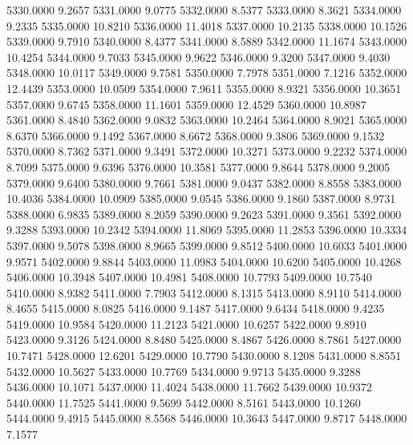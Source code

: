 5330.0000      9.2657
5331.0000      9.0775
5332.0000      8.5377
5333.0000      8.3621
5334.0000      9.2335
5335.0000     10.8210
5336.0000     11.4018
5337.0000     10.2135
5338.0000     10.1526
5339.0000      9.7910
5340.0000      8.4377
5341.0000      8.5889
5342.0000     11.1674
5343.0000     10.4254
5344.0000      9.7033
5345.0000      9.9622
5346.0000      9.3200
5347.0000      9.4030
5348.0000     10.0117
5349.0000      9.7581
5350.0000      7.7978
5351.0000      7.1216
5352.0000     12.4439
5353.0000     10.0509
5354.0000      7.9611
5355.0000      8.9321
5356.0000     10.3651
5357.0000      9.6745
5358.0000     11.1601
5359.0000     12.4529
5360.0000     10.8987
5361.0000      8.4840
5362.0000      9.0832
5363.0000     10.2464
5364.0000      8.9021
5365.0000      8.6370
5366.0000      9.1492
5367.0000      8.6672
5368.0000      9.3806
5369.0000      9.1532
5370.0000      8.7362
5371.0000      9.3491
5372.0000     10.3271
5373.0000      9.2232
5374.0000      8.7099
5375.0000      9.6396
5376.0000     10.3581
5377.0000      9.8644
5378.0000      9.2005
5379.0000      9.6400
5380.0000      9.7661
5381.0000      9.0437
5382.0000      8.8558
5383.0000     10.4036
5384.0000     10.0909
5385.0000      9.0545
5386.0000      9.1860
5387.0000      8.9731
5388.0000      6.9835
5389.0000      8.2059
5390.0000      9.2623
5391.0000      9.3561
5392.0000      9.3288
5393.0000     10.2342
5394.0000     11.8069
5395.0000     11.2853
5396.0000     10.3334
5397.0000      9.5078
5398.0000      8.9665
5399.0000      9.8512
5400.0000     10.6033
5401.0000      9.9571
5402.0000      9.8844
5403.0000     11.0983
5404.0000     10.6200
5405.0000     10.4268
5406.0000     10.3948
5407.0000     10.4981
5408.0000     10.7793
5409.0000     10.7540
5410.0000      8.9382
5411.0000      7.7903
5412.0000      8.1315
5413.0000      8.9110
5414.0000      8.4655
5415.0000      8.0825
5416.0000      9.1487
5417.0000      9.6434
5418.0000      9.4235
5419.0000     10.9584
5420.0000     11.2123
5421.0000     10.6257
5422.0000      9.8910
5423.0000      9.3126
5424.0000      8.8480
5425.0000      8.4867
5426.0000      8.7861
5427.0000     10.7471
5428.0000     12.6201
5429.0000     10.7790
5430.0000      8.1208
5431.0000      8.8551
5432.0000     10.5627
5433.0000     10.7769
5434.0000      9.9713
5435.0000      9.3288
5436.0000     10.1071
5437.0000     11.4024
5438.0000     11.7662
5439.0000     10.9372
5440.0000     11.7525
5441.0000      9.5699
5442.0000      8.5161
5443.0000     10.1260
5444.0000      9.4915
5445.0000      8.5568
5446.0000     10.3643
5447.0000      9.8717
5448.0000      7.1577
